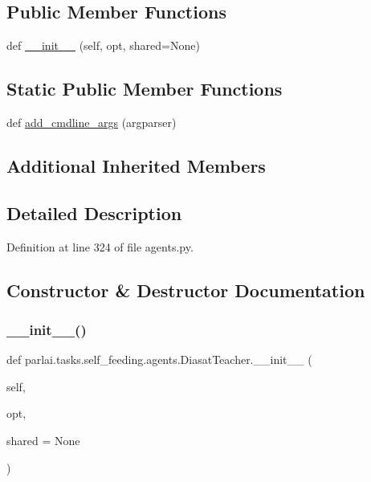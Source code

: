 \subsection*{Public Member Functions}
\begin{DoxyCompactItemize}
\item 
def \hyperlink{classparlai_1_1tasks_1_1self__feeding_1_1agents_1_1DiasatTeacher_aeffe6f4b3c3bd2800c6745da4ab95015}{\+\_\+\+\_\+init\+\_\+\+\_\+} (self, opt, shared=None)
\end{DoxyCompactItemize}
\subsection*{Static Public Member Functions}
\begin{DoxyCompactItemize}
\item 
def \hyperlink{classparlai_1_1tasks_1_1self__feeding_1_1agents_1_1DiasatTeacher_a28eadfed974fe247525076406032e7ec}{add\+\_\+cmdline\+\_\+args} (argparser)
\end{DoxyCompactItemize}
\subsection*{Additional Inherited Members}


\subsection{Detailed Description}


Definition at line 324 of file agents.\+py.



\subsection{Constructor \& Destructor Documentation}
\mbox{\label{classparlai_1_1tasks_1_1self__feeding_1_1agents_1_1DiasatTeacher_aeffe6f4b3c3bd2800c6745da4ab95015}} 
\subsubsection{\texorpdfstring{\+\_\+\+\_\+init\+\_\+\+\_\+()}{\_\_init\_\_()}}
{\footnotesize\ttfamily def parlai.\+tasks.\+self\+\_\+feeding.\+agents.\+Diasat\+Teacher.\+\_\+\+\_\+init\+\_\+\+\_\+ (\begin{DoxyParamCaption}\item[{}]{self,  }\item[{}]{opt,  }\item[{}]{shared = {\ttfamily None} }\end{DoxyParamCaption})}




